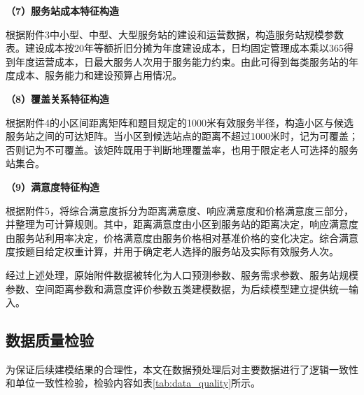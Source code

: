 \documentclass[UTF8]{ctexart}
\begin{document}
\textbf{（7）服务站成本特征构造}

根据附件3中小型、中型、大型服务站的建设和运营数据，构造服务站规模参数表。建设成本按20年等额折旧分摊为年度建设成本，日均固定管理成本乘以365得到年度运营成本，日最大服务人次用于服务能力约束。由此可得到每类服务站的年度成本、服务能力和建设预算占用情况。

\textbf{（8）覆盖关系特征构造}

根据附件4的小区间距离矩阵和题目规定的1000米有效服务半径，构造小区与候选服务站之间的可达矩阵。当小区到候选站点的距离不超过1000米时，记为可覆盖；否则记为不可覆盖。该矩阵既用于判断地理覆盖率，也用于限定老人可选择的服务站集合。

\textbf{（9）满意度特征构造}

根据附件5，将综合满意度拆分为距离满意度、响应满意度和价格满意度三部分，并整理为可计算规则。其中，距离满意度由小区到服务站的距离决定，响应满意度由服务站利用率决定，价格满意度由服务价格相对基准价格的变化决定。综合满意度按题目给定权重计算，并用于确定老人选择的服务站及实际有效服务人次。

经过上述处理，原始附件数据被转化为人口预测参数、服务需求参数、服务站规模参数、空间距离参数和满意度评价参数五类建模数据，为后续模型建立提供统一输入。

\subsection{数据质量检验}

为保证后续建模结果的合理性，本文在数据预处理后对主要数据进行了逻辑一致性和单位一致性检验，检验内容如表\ref{tab:data_quality}所示。
\end{document}
